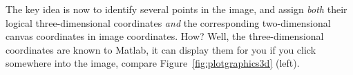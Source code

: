{{{\setlength{\fboxsep}{0pt}%
\centering%
%
}

The key idea is now to identify several points in the image, and assign
\emph{both} their logical three-dimensional coordinates \emph{and} the
corresponding two-dimensional canvas coordinates in image coordinates. How?
Well, the three-dimensional coordinates are known to Matlab, it can display
them for you if you click somewhere into the image, compare
Figure~\ref{fig:plotgraphics3d} (left).


}}
